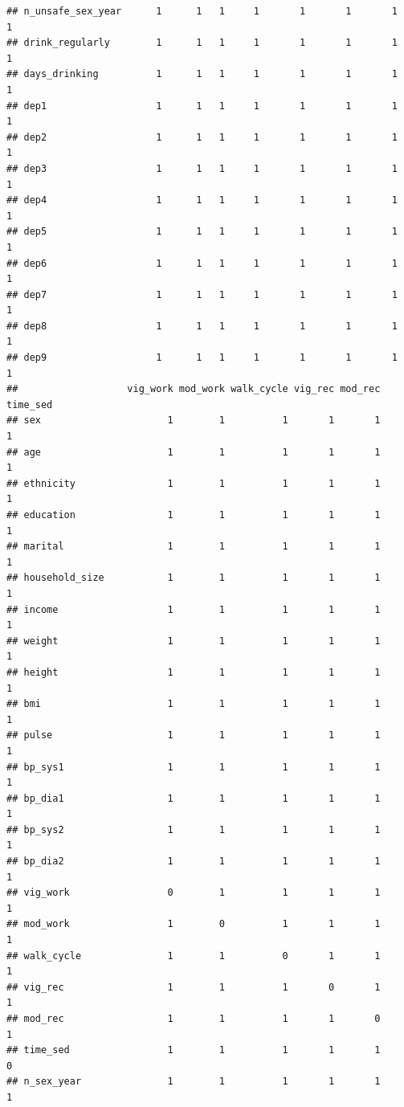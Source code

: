 \documentclass[
]{article}
\begin{document}
\begin{verbatim}
## n_unsafe_sex_year      1      1   1     1       1       1       1       1
## drink_regularly        1      1   1     1       1       1       1       1
## days_drinking          1      1   1     1       1       1       1       1
## dep1                   1      1   1     1       1       1       1       1
## dep2                   1      1   1     1       1       1       1       1
## dep3                   1      1   1     1       1       1       1       1
## dep4                   1      1   1     1       1       1       1       1
## dep5                   1      1   1     1       1       1       1       1
## dep6                   1      1   1     1       1       1       1       1
## dep7                   1      1   1     1       1       1       1       1
## dep8                   1      1   1     1       1       1       1       1
## dep9                   1      1   1     1       1       1       1       1
##                   vig_work mod_work walk_cycle vig_rec mod_rec time_sed
## sex                      1        1          1       1       1        1
## age                      1        1          1       1       1        1
## ethnicity                1        1          1       1       1        1
## education                1        1          1       1       1        1
## marital                  1        1          1       1       1        1
## household_size           1        1          1       1       1        1
## income                   1        1          1       1       1        1
## weight                   1        1          1       1       1        1
## height                   1        1          1       1       1        1
## bmi                      1        1          1       1       1        1
## pulse                    1        1          1       1       1        1
## bp_sys1                  1        1          1       1       1        1
## bp_dia1                  1        1          1       1       1        1
## bp_sys2                  1        1          1       1       1        1
## bp_dia2                  1        1          1       1       1        1
## vig_work                 0        1          1       1       1        1
## mod_work                 1        0          1       1       1        1
## walk_cycle               1        1          0       1       1        1
## vig_rec                  1        1          1       0       1        1
## mod_rec                  1        1          1       1       0        1
## time_sed                 1        1          1       1       1        0
## n_sex_year               1        1          1       1       1        1

\end{verbatim}
\end{document}
